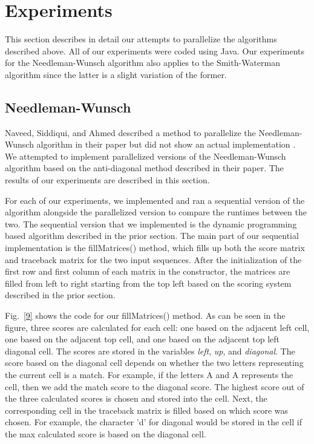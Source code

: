 \documentclass[conference]{IEEEtran}
\begin{document}
\section{Experiments}

This section describes in detail our attempts to parallelize the algorithms described above. All of our experiments were coded using Java. Our experiments for the Needleman-Wunsch algorithm also applies to the Smith-Waterman algorithm since the latter is a slight variation of the former.

\setcounter{subsection}{0}

\subsection{Needleman-Wunsch}
Naveed, Siddiqui, and Ahmed described a method to parallelize the Needleman-Wunsch algorithm in their paper but did not show an actual implementation \cite{naveed_siddiqui_ahmed}. We attempted to implement parallelized versions of the Needleman-Wunsch algorithm based on the anti-diagonal method described in their paper. The results of our experiments are described in this section.

For each of our experiments, we implemented and ran a sequential version of the algorithm alongside the parallelized version to compare the runtimes between the two. The sequential version that we implemented is the dynamic programming based algorithm described in the prior section. The main part of our sequential implementation is the fillMatrices() method, which fills up both the score matrix and traceback matrix for the two input sequences. After the initialization of the first row and first column of each matrix in the constructor, the matrices are filled from left to right starting from the top left based on the scoring system described in the prior section.

Fig.~\ref{9} shows the code for our fillMatrices() method. As can be seen in the figure, three scores are calculated for each cell: one based on the adjacent left cell, one based on the adjacent top cell, and one based on the adjacent top left diagonal cell. The scores are stored in the variables \emph{left}, \emph{up}, and \emph{diagonal}. The score based on the diagonal cell depends on whether the two letters representing the current cell is a match. For example, if the letters A and A represents the cell, then we add the match score to the diagonal score. The highest score out of the three calculated scores is chosen and stored into the cell. Next, the corresponding cell in the traceback matrix is filled based on which score was chosen. For example, the character 'd' for diagonal would be stored in the cell if the max calculated score is based on the diagonal cell.
\end{document}
